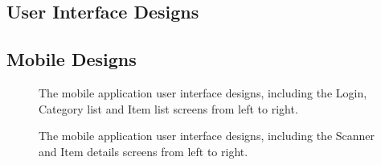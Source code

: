 \documentclass[a4paper,11pt]{report}
\begin{document}
\newpage
{}
\begin{appendix}
    \chapter{User Interface Designs}
    \section{Mobile Designs}
    \label{appendix:mobileDesign}
        \begin{figure}[H]
            \centering
            \caption{The mobile application user interface designs, including the Login, Category list and Item list screens from left to right.}
            \label{fig:mobileUIpt1}
        \end{figure}
        \begin{figure}[H]
            \centering
            \caption{The mobile application user interface designs, including the Scanner and Item details screens from left to right.}
            \label{fig:mobileUIpt2}
        \end{figure}


\end{appendix}
\end{document}
